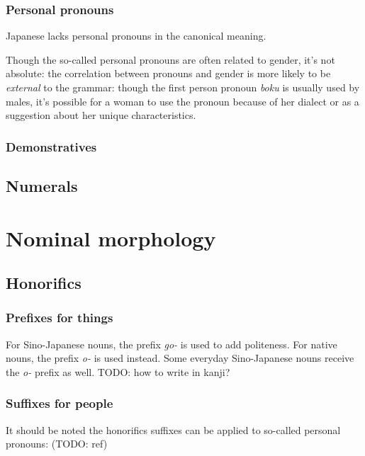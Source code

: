 \documentclass[UTF8, a4paper, oneside, scheme=plain]{ctexrep}
\newcommand{\corpus}[1]{\emph{#1}}
\begin{document}
\subsection{Personal pronouns}\label{sec:personal-pronoun}

Japanese lacks personal pronouns in the canonical meaning.

Though the so-called personal pronouns are often related to gender, 
it's not absolute: 
the correlation between pronouns and gender is more likely 
to be \emph{external} to the grammar:
though the first person pronoun \corpus{boku} is usually used by males,
it's possible for a woman to use the pronoun 
because of her dialect or
as a suggestion about her unique characteristics.

\subsection{Demonstratives}

\section{Numerals}

\chapter{Nominal morphology}

\section{Honorifics}\label{sec:nominal-polite}

\subsection{Prefixes for things}\label{sec:object-honorifics-prefix}

For Sino-Japanese nouns, the prefix \corpus{go-} is used to add politeness.
For native nouns, the prefix \corpus{o-} is used instead.
Some everyday Sino-Japanese nouns receive the \corpus{o-} prefix as well.
TODO: how to write in kanji?

\subsection{Suffixes for people}

It should be noted the honorifics suffixes can be applied to so-called personal pronouns: (TODO: ref)
\end{document}
